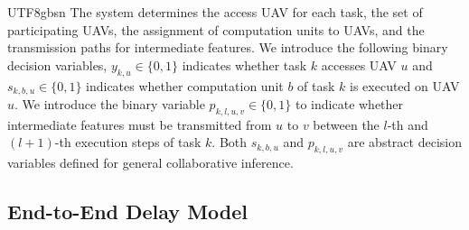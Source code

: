 \documentclass[journal]{IEEEtran}
\begin{document}
\begin{CJK*}{UTF8}{gbsn}
The system determines the access UAV for each task, the set of participating UAVs, the assignment of computation units to UAVs, and the transmission paths for intermediate features. We introduce the following binary decision variables, \(y_{k,u} \in \{0,1\}\) indicates whether task \(k\) accesses UAV \(u\) and
\(s_{k,b,u} \in \{0,1\}\) indicates whether computation unit \(b\) of task \(k\) is executed on UAV \(u\). 
We introduce the binary variable \( p_{k,l,u,v} \in \{0,1\} \) to indicate whether intermediate features must be transmitted from \( u \) to \( v \) between the \( l \)-th and \( (l+1) \)-th execution steps of task \( k \). Both \( s_{k,b,u} \) and \( p_{k,l,u,v} \) are abstract decision variables defined for general collaborative inference.%


\subsection{End-to-End Delay Model}


\end{CJK*}
\end{document}
